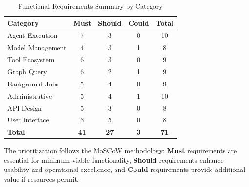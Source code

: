 \begin{table}[htbp]
\centering
\caption{Functional Requirements Summary by Category}
\label{tab:fr-summary}
\begin{tabular}{|l|c|c|c|c|}
\hline
\textbf{Category} & \textbf{Must} & \textbf{Should} & \textbf{Could} & \textbf{Total} \\
\hline
Agent Execution & 7 & 3 & 0 & 10 \\
Model Management & 4 & 3 & 1 & 8 \\
Tool Ecosystem & 6 & 3 & 0 & 9 \\
Graph Query & 6 & 2 & 1 & 9 \\
Background Jobs & 5 & 4 & 0 & 9 \\
Administrative & 5 & 4 & 1 & 10 \\
API Design & 5 & 3 & 0 & 8 \\
User Interface & 3 & 5 & 0 & 8 \\
\hline
\textbf{Total} & \textbf{41} & \textbf{27} & \textbf{3} & \textbf{71} \\
\hline
\end{tabular}
\end{table}

The prioritization follows the MoSCoW methodology: \textbf{Must} requirements are essential for minimum viable functionality, \textbf{Should} requirements enhance usability and operational excellence, and \textbf{Could} requirements provide additional value if resources permit.

